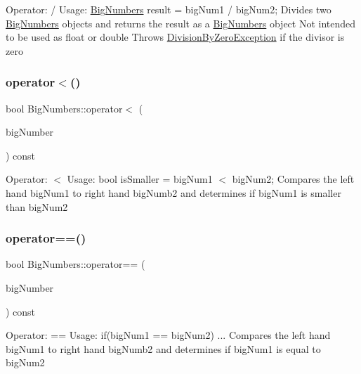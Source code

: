 Operator\+: / Usage\+: \mbox{\hyperlink{class_big_numbers}{Big\+Numbers}} result = big\+Num1 / big\+Num2; Divides two \mbox{\hyperlink{class_big_numbers}{Big\+Numbers}} objects and returns the result as a \mbox{\hyperlink{class_big_numbers}{Big\+Numbers}} object Not intended to be used as float or double Throws \mbox{\hyperlink{class_big_numbers_1_1_division_by_zero_exception}{Division\+By\+Zero\+Exception}} if the divisor is zero \mbox{\label{class_big_numbers_aed0d88ccd1ba6d7b1548c14a95de1b1a}} 
\subsubsection{\texorpdfstring{operator$<$()}{operator<()}}
{\footnotesize\ttfamily bool Big\+Numbers\+::operator$<$ (\begin{DoxyParamCaption}\item[{const \mbox{\hyperlink{class_big_numbers}{Big\+Numbers}} \&}]{big\+Number }\end{DoxyParamCaption}) const}

Operator\+: $<$ Usage\+: bool is\+Smaller = big\+Num1 $<$ big\+Num2; Compares the left hand big\+Num1 to right hand big\+Numb2 and determines if big\+Num1 is smaller than big\+Num2 \mbox{\label{class_big_numbers_a7c84969ba0fe1401cfb30544cb0d91a5}} 
\subsubsection{\texorpdfstring{operator==()}{operator==()}}
{\footnotesize\ttfamily bool Big\+Numbers\+::operator== (\begin{DoxyParamCaption}\item[{const \mbox{\hyperlink{class_big_numbers}{Big\+Numbers}} \&}]{big\+Number }\end{DoxyParamCaption}) const}

Operator\+: == Usage\+: if(big\+Num1 == big\+Num2) ... Compares the left hand big\+Num1 to right hand big\+Numb2 and determines if big\+Num1 is equal to big\+Num2 \mbox{\label{class_big_numbers_a5fed3d1c9f239f4c57348953077eab77}} 
